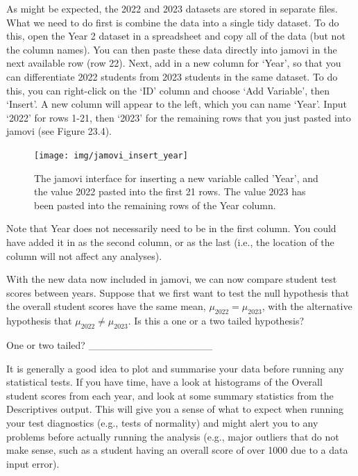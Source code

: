 \documentclass[
]{scrbook}
\begin{document}
As might be expected, the 2022 and 2023 datasets are stored in separate files.
What we need to do first is combine the data into a single tidy dataset.
To do this, open the Year 2 dataset in a spreadsheet and copy all of the data (but not the column names).
You can then paste these data directly into jamovi in the next available row (row 22).
Next, add in a new column for `Year', so that you can differentiate 2022 students from 2023 students in the same dataset.
To do this, you can right-click on the `ID' column and choose `Add Variable', then `Insert'.
A new column will appear to the left, which you can name `Year'.
Input `2022' for rows 1-21, then `2023' for the remaining rows that you just pasted into jamovi (see Figure 23.4).

\begin{figure}
\texttt{[image: img/jamovi\_insert\_year]} \caption{The jamovi interface for inserting a new variable called 'Year', and the value 2022 pasted into the first 21 rows. The value 2023 has been pasted into the remaining rows of the Year column.}\label{fig:unnamed-chunk-104}
\end{figure}

Note that Year does not necessarily need to be in the first column.
You could have added it in as the second column, or as the last (i.e., the location of the column will not affect any analyses).

With the new data now included in jamovi, we can now compare student test scores between years.
Suppose that we first want to test the null hypothesis that the overall student scores have the same mean, \(\mu_{2022} = \mu_{2023}\), with the alternative hypothesis that \(\mu_{2022} \neq \mu_{2023}\).
Is this a one or a two tailed hypothesis?

One or two tailed? \_\_\_\_\_\_\_\_\_\_\_\_\_\_\_\_\_

It is generally a good idea to plot and summarise your data before running any statistical tests.
If you have time, have a look at histograms of the Overall student scores from each year, and look at some summary statistics from the Descriptives output.
This will give you a sense of what to expect when running your test diagnostics (e.g., tests of normality) and might alert you to any problems before actually running the analysis (e.g., major outliers that do not make sense, such as a student having an overall score of over 1000 due to a data input error).
\end{document}
